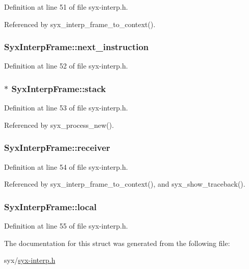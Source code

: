 Definition at line 51 of file syx-interp.h.

Referenced by syx\_\-interp\_\-frame\_\-to\_\-context().\hypertarget{struct_syx_interp_frame_d45f49115a5305fc901fceca4c72d32e}{
\subsubsection{ {\bf SyxInterpFrame::next\_\-instruction}}}
\label{struct_syx_interp_frame_d45f49115a5305fc901fceca4c72d32e}




Definition at line 52 of file syx-interp.h.\hypertarget{struct_syx_interp_frame_034d55521abf77019c77090a5bef941f}{
\subsubsection{$\ast$ {\bf SyxInterpFrame::stack}}}
\label{struct_syx_interp_frame_034d55521abf77019c77090a5bef941f}




Definition at line 53 of file syx-interp.h.

Referenced by syx\_\-process\_\-new().\hypertarget{struct_syx_interp_frame_c40cce129c0dadcfe2bae7ccdbdc431b}{
\subsubsection{ {\bf SyxInterpFrame::receiver}}}
\label{struct_syx_interp_frame_c40cce129c0dadcfe2bae7ccdbdc431b}




Definition at line 54 of file syx-interp.h.

Referenced by syx\_\-interp\_\-frame\_\-to\_\-context(), and syx\_\-show\_\-traceback().\hypertarget{struct_syx_interp_frame_f98a9a47dea773894bddcac57c9dddb3}{
\subsubsection{ {\bf SyxInterpFrame::local}}}
\label{struct_syx_interp_frame_f98a9a47dea773894bddcac57c9dddb3}




Definition at line 55 of file syx-interp.h.

The documentation for this struct was generated from the following file:\begin{CompactItemize}
\item 
syx/\hyperlink{syx-interp_8h}{syx-interp.h}\end{CompactItemize}
